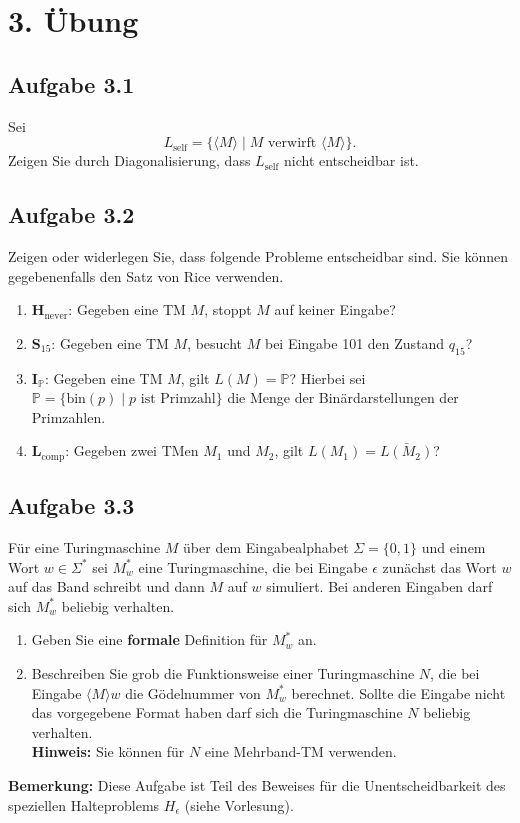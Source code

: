 \section*{3. Übung}
\subsection*{Aufgabe 3.1}
Sei $$L_\text{self} = \{\langle M \rangle \mid M \text{ verwirft } \langle M \rangle \}.$$
Zeigen Sie durch Diagonalisierung, dass $L_\text{self}$ nicht entscheidbar ist.

\subsection*{Aufgabe 3.2}
Zeigen oder widerlegen Sie, dass folgende Probleme entscheidbar sind. Sie können gegebenenfalls den Satz von Rice verwenden.
\begin{enumerate}
	\item $\textbf{H}_\text{never}$: Gegeben eine TM $M$, stoppt $M$ auf keiner Eingabe?
	\item $\textbf{S}_{15}$: Gegeben eine TM $M$, besucht $M$ bei Eingabe 101 den Zustand $q_{15}$?
	\item $\textbf{I}_\mathbb{P}$: Gegeben eine TM $M$, gilt $L(M)= \mathbb{P}$? Hierbei sei $\mathbb{P} = \{\text{bin}(p) \mid p \text{ ist Primzahl} \}$ die Menge der Binärdarstellungen der Primzahlen.
	\item $\textbf{L}_\text{comp}$: Gegeben zwei TMen $M_1$ und $M_2$, gilt $L(M_1) = \bar{L(M_{2})}$?
\end{enumerate}

\subsection*{Aufgabe 3.3}
Für eine Turingmaschine $M$ über dem Eingabealphabet $\Sigma = \{0,1\}$ und einem Wort $w \in \Sigma^*$ sei $M_w^*$ eine Turingmaschine, die bei Eingabe $\epsilon$ zunächst das Wort $w$ auf das Band schreibt und dann $M$ auf $w$ simuliert. Bei anderen Eingaben darf sich $M_w^*$ beliebig verhalten.
\begin{enumerate}
	\item Geben Sie eine \textbf{formale} Definition für $M_w^*$ an.
	\item Beschreiben Sie grob die Funktionsweise einer Turingmaschine $N$, die bei Eingabe $\langle M \rangle w$ die Gödelnummer von $M_w^*$ berechnet. Sollte die Eingabe nicht das vorgegebene Format haben darf sich die Turingmaschine $N$ beliebig verhalten.\\
	\textbf{Hinweis:} Sie können für $N$  eine Mehrband-TM verwenden.
\end{enumerate}
\textbf{Bemerkung:} Diese Aufgabe ist Teil des Beweises für die Unentscheidbarkeit des speziellen Halteproblems $H_\epsilon$ (siehe Vorlesung).